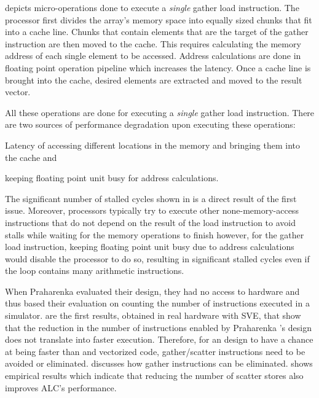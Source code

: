  depicts micro-operations done to execute a \emph{single} gather load instruction. 
The processor first divides the array's memory space into equally sized chunks that fit into a cache line. Chunks that contain elements that are the target of the gather instruction are then moved to the cache. This requires calculating the memory address of each single element to be accessed. Address calculations are done in floating point operation pipeline \cite{A64FXmanual} which increases the latency. Once a cache line is brought into the cache, desired elements are extracted and moved to the result vector.

All these operations are done for executing a \emph{single} gather load instruction. There are two sources of performance degradation upon executing these operations:
\begin{inparaenum}
\item Latency of accessing different locations in the memory and bringing them into the cache and \item keeping floating point unit busy for address calculations.
\end{inparaenum}

The significant number of stalled cycles shown in  is a direct result of the first issue. Moreover, processors typically try to execute other none-memory-access instructions that do not depend on the result of the load instruction to avoid stalls while waiting for the memory operations to finish however, for the gather load instruction, keeping floating point unit busy due to address calculations would disable the processor to do so, resulting in significant stalled cycles even if the loop contains many arithmetic instructions.


When Praharenka \etal evaluated their design, they had no access to hardware and thus based their evaluation on counting the number of instructions executed in a simulator.
 are the first results, obtained in real hardware with SVE, that show that the reduction in the number of instructions enabled by Praharenka \etal's \ALC design does not translate into faster execution.
Therefore, for an \ALC design to have a chance at being faster than \ifconverted and vectorized code, gather/scatter instructions need to be avoided or eliminated.
 discusses how gather instructions can be eliminated.
 shows empirical results which indicate that reducing the number of scatter stores also improves ALC's performance.

